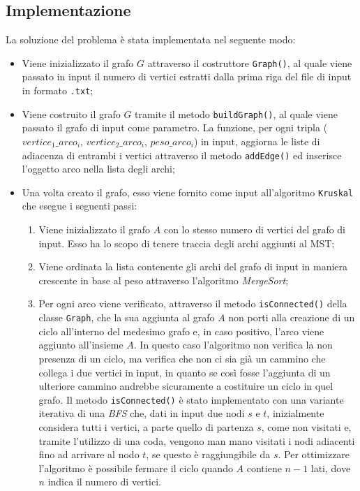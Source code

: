 \subsection{Implementazione}
	La soluzione del problema è stata implementata nel seguente modo:
	\begin{itemize}
		\item Viene inizializzato il grafo $G$ attraverso il costruttore \texttt{Graph()}, al quale viene passato in input il numero di vertici estratti dalla prima riga del file di input in formato \texttt{.txt};
		\item Viene costruito il grafo $G$ tramite il metodo \texttt{buildGraph()}, al quale viene passato il grafo di input come parametro. 
		La funzione, per ogni tripla ($vertice_1\_arco_i$, $vertice_2\_arco_i$, $peso\_arco_i$) in input, aggiorna le liste di adiacenza di entrambi i vertici attraverso il metodo \texttt{addEdge()} ed inserisce l'oggetto arco nella lista degli archi; 
		\item Una volta creato il grafo, esso viene fornito come input all'algoritmo \texttt{Kruskal} che esegue i seguenti passi:
		\begin{enumerate}
			\item Viene inizializzato il grafo $A$ con lo stesso numero di vertici del grafo di input. 
			Esso ha lo scopo di tenere traccia degli archi aggiunti al MST;
			\item Viene ordinata la lista contenente gli archi del grafo di input in maniera crescente in base al peso attraverso l'algoritmo \textit{MergeSort};
			\item Per ogni arco viene verificato, attraverso il metodo \texttt{isConnected()} della classe \texttt{Graph}, che la sua aggiunta al grafo $A$ non porti alla creazione di un ciclo all'interno del medesimo grafo e, in caso positivo, l'arco viene aggiunto all'insieme $A$. 
			In questo caso l'algoritmo non verifica la non presenza di un ciclo, ma verifica che non ci sia già un cammino che collega i due vertici in input, in quanto se così fosse l'aggiunta di un ulteriore cammino andrebbe sicuramente a costituire un ciclo in quel grafo. 
			Il metodo \texttt{isConnected()} è stato implementato con una variante iterativa di una \textit{BFS} che, dati in input due nodi $s$ e $t$, inizialmente considera tutti i vertici, a parte quello di partenza $s$, come non visitati e, tramite l'utilizzo di una coda, vengono man mano visitati i nodi adiacenti fino ad arrivare al nodo $t$, se questo è raggiungibile da $s$. 
			Per ottimizzare l'algoritmo è possibile fermare il ciclo quando $A$ contiene $n-1$ lati, dove $n$ indica il numero di vertici.
		\end{enumerate}
	\end{itemize}

